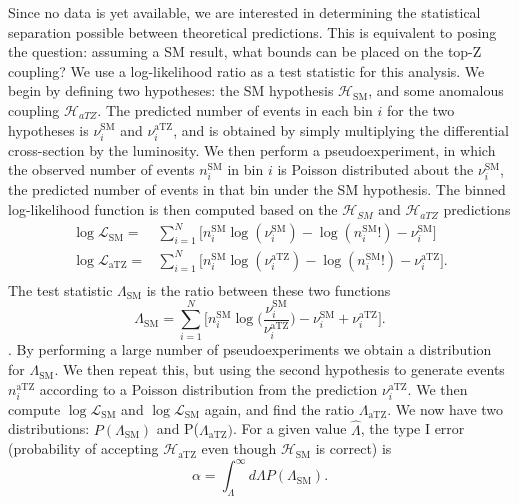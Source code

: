 \documentclass[preprint]{JHEP3} %
\newcommand{\SM}{\mathrm{SM}}
\newcommand{\aTZ}{\mathrm{aTZ}}
\def\hLambda {\hat{\Lambda}}
\begin{document}
 
Since no data is yet available, we are interested in determining the statistical separation possible between theoretical predictions. This is equivalent to posing the question: assuming a SM result, what bounds can be placed on the top-Z coupling? 
We use a log-likelihood ratio as a test statistic for this analysis. We begin by defining two hypotheses: the SM hypothesis $\mathcal{H}_{\mathrm{SM}}$, and some anomalous coupling $\mathcal{H}_{aTZ}$. The predicted number of events in each bin $i$ for the two hypotheses is $\nu_i^{\mathrm{SM}}$ and $\nu_i^{\aTZ}$, and is obtained by simply multiplying the differential cross-section by the luminosity. We then perform a pseudoexperiment, in which the observed number of events $n_i^{\SM}$ in bin $i$ is Poisson distributed about the $\nu_i^{\mathrm{SM}}$, the predicted number of events in that bin under the SM hypothesis.  The binned log-likelihood function is then computed based on the $\mathcal{H}_{SM}$ and $\mathcal{H}_{aTZ}$ predictions
\begin{equation}
\begin{split}
\log\mathcal{L}_{\SM}  =& \sum_{i=1}^N \bigl[ n_i^{\SM}\log(\nu_i^{\SM})-\log(n_i^{\SM}!) -\nu_i^{\SM} \bigr] \\
\log\mathcal{L}_{\aTZ}  =& \sum_{i=1}^N \bigl[ n_i^{\SM}\log(\nu_i^{\aTZ})-\log(n_i^{\SM}!) -\nu_i^{\aTZ} \bigr]. \\
\end{split}
\end{equation}
The test statistic $\Lambda_{\SM}$ is the ratio between these two functions 
\begin{equation}
\Lambda_{\SM} = \sum_{i=1}^N \bigl[ n_i^{\SM}\log \bigl( \frac{\nu_i^{\SM}}{\nu_i^{\aTZ}} \bigr) -\nu_i^{\SM} + \nu_i^{\aTZ} \bigr]. 
\end{equation}.
By performing a large number of pseudoexperiments we obtain a distribution for $\Lambda_{\SM}$. We then repeat this, but using the second hypothesis to generate events $n_i^{\aTZ}$ according to a Poisson distribution from the prediction $\nu_i^{\aTZ}$. We then compute $\log\mathcal{L}_{\SM}$ and $\log\mathcal{L}_{\SM}$ again, and find the ratio $\Lambda_{\aTZ}$. We now have two distributions: $P(\Lambda_{\SM})$ and P($\Lambda_{\aTZ})$. For a given value $\hat{\Lambda}$, the type I error (probability of accepting $\mathcal{H}_{\aTZ}$ even though $\mathcal{H}_{\SM}$ is correct) is
\begin{equation}
\alpha = \int_{\hLambda}^{\infty} d\Lambda P(\Lambda_{\SM}).
\end{equation}
\end{document}
